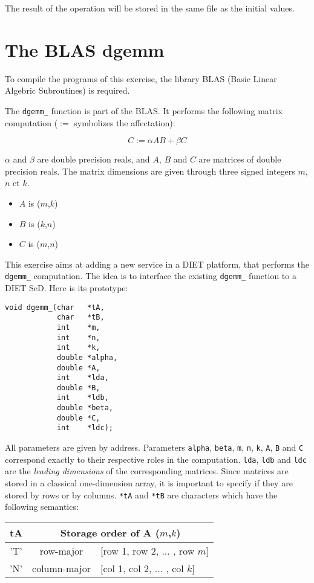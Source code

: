 \documentclass[11pt,a4paper]{article}
\begin{document}
The result of the operation will be stored in the same file as the initial values.


\section{The BLAS dgemm}

To compile the programs of this exercise, the library BLAS (Basic Linear Algebric
Subroutines) is required.

The \texttt{dgemm\_} function is part of the BLAS. It performs the following matrix
computation ($:=$ symbolizes the affectation):

$$ C := \alpha A B + \beta C $$

$\alpha$ and $\beta$ are double precision reals, and $A$, $B$ and $C$ are
matrices of double precision reals.
The matrix dimensions are given through three signed integers $m$, $n$ et $k$.
\begin{itemize}
\item{$A$ is ($m$,$k$)}
\item{$B$ is ($k$,$n$)}
\item{$C$ is ($m$,$n$)}
\end{itemize}

This exercise aims at adding a new service in a DIET platform, that performs the
\texttt{dgemm\_} computation. The idea is to interface the existing
\texttt{dgemm\_} function to a DIET SeD. Here is its prototype:
\begin{verbatim}
void dgemm_(char   *tA,
            char   *tB,
            int    *m,
            int    *n,
            int    *k,
            double *alpha,
            double *A,
            int    *lda,
            double *B,
            int    *ldb,
            double *beta,
            double *C,
            int    *ldc);
\end{verbatim}

All parameters are given by address. Parameters \texttt{alpha}, \texttt{beta},
\texttt{m}, \texttt{n}, \texttt{k}, \texttt{A}, \texttt{B} and \texttt{C}
correspond exactly to their respective roles in the computation. \texttt{lda},
\texttt{ldb} and \texttt{ldc} are the \emph{leading dimensions} of the
corresponding matrices. Since matrices are stored in a classical one-dimension
array, it is important to specify if they are stored by rows or by columns.
\texttt{*tA} and \texttt{*tB} are characters which have the following semantics:
\begin{center}
\begin{tabular}{|c|c|l|}\hline
tA  &  \multicolumn{2}{c|}{Storage order of A ($m$,$k$)}\\\hline
'T' &  row-major    & [row 1, row 2, ... , row $m$]\\
'N' &  column-major & [col 1, col 2, ... , col $k$] \\\hline
\end{tabular}
\end{center}
\end{document}

